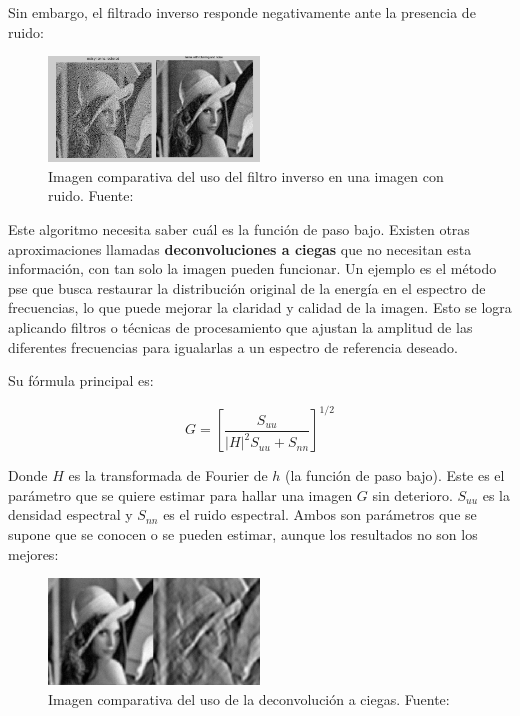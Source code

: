 	Sin embargo, el filtrado inverso responde negativamente ante la presencia de ruido:
	
\begin{figure}[H]
	\centering
	\includegraphics[width=0.5\textwidth]{figures/lenna_inverse_dir_noise.png}
	\caption{\label{fig:lenna_inverse_dir_noise} Imagen comparativa del uso del filtro inverso en una imagen con ruido. Fuente: \cite{OWLNet_inverse}}
\end{figure}


Este algoritmo necesita saber cuál es la función de paso bajo. Existen otras aproximaciones llamadas \textbf{deconvoluciones a ciegas} que no necesitan esta información, con tan solo la imagen pueden funcionar. Un ejemplo es el método \gls{pse} que busca restaurar la distribución original de la energía en el espectro de frecuencias, lo que puede mejorar la claridad y calidad de la imagen. Esto se logra aplicando filtros o técnicas de procesamiento que ajustan la amplitud de las diferentes frecuencias para igualarlas a un espectro de referencia deseado\cite{OWLNet_blind}.

Su fórmula principal es:

\begin{equation}
G = [\frac{S_{uu}}{|H|^2S_{uu}+S_{nn}}]^{1/2}\label{eq:PSE}
\end{equation}
	
Donde $H$ es la transformada de Fourier de $h$ (la función de paso bajo). Este es el parámetro que se quiere estimar para hallar una imagen $G$ sin deterioro. $S_{uu}$ es la densidad espectral y $S_{nn}$ es el ruido espectral. Ambos son parámetros que se supone que se conocen o se pueden estimar, aunque los resultados no son los mejores:

\begin{figure}[H]
	\centering
	\includegraphics[width=0.5\textwidth]{figures/lenna_blind_deconv.png}
	\caption{\label{fig:lenna_blind_deconv}Imagen comparativa del uso de la deconvolución a ciegas. Fuente: \cite{OWLNet_blind}}
\end{figure}

